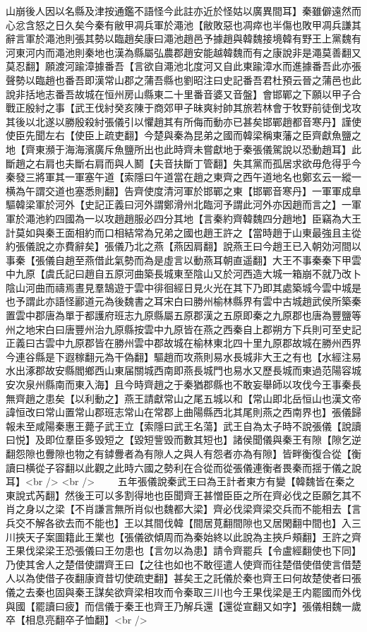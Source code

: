 山崩後人因以名縣及津按通鑑不語怪今此註亦近於怪姑以廣異間耳】秦雖僻遠然而心忿含怒之日久矣今秦有敝甲凋兵軍於澠池【敝敗惡也凋瘁也半傷也敗甲凋兵謙其辭言軍於澠池則張其勢以臨趙矣康曰澠池趙邑予據趙與韓魏接境韓有野王上黨魏有河東河内而澠池則秦地也漢為縣屬弘農郡趙安能越韓魏而有之康說非是澠莫善翻又莫忍翻】願渡河踰漳據番吾【言欲自澠池北度河又自此東踰漳水而進據番吾此亦張聲勢以臨趙也番吾即漢常山郡之蒲吾縣也劉昭注曰史記番吾君杜預云晉之蒲邑也此說非括地志番吾故城在恒州房山縣東二十里番音婆又音盤】會邯鄲之下願以甲子合戰正殷紂之事【武王伐紂癸亥陳于商郊甲子昧爽紂帥其旅若林會于牧野前徒倒戈攻其後以北遂以勝殷殺紂張儀引以懼趙其有所侮而動亦已甚矣邯鄲趙都音寒丹】謹使使臣先聞左右【使臣上疏吏翻】今楚與秦為昆弟之國而韓梁稱東藩之臣齊獻魚鹽之地【齊東瀕于海海濱廣斥魚鹽所出也此時齊未嘗獻地于秦張儀駕說以恐動趙耳】此斷趙之右肩也夫斷右肩而與人鬭【夫音扶斷丁管翻】失其黨而孤居求欲毋危得乎今秦發三將軍其一軍塞午道【索隱曰午道當在趙之東齊之西午道地名也鄭玄云一縱一横為午謂交道也塞悉則翻】告齊使度清河軍於邯鄲之東【邯鄲音寒丹】一軍軍成臯驅韓梁軍於河外【史記正義曰河外謂鄭滑州北臨河予謂此河外亦因趙而言之】一軍軍於澠池約四國為一以攻趙趙服必四分其地【言秦約齊韓魏四分趙地】臣竊為大王計莫如與秦王面相約而口相結常為兄弟之國也趙王許之【當時趙于山東最強且主從約張儀說之亦費辭矣】張儀乃北之燕【燕因肩翻】說燕王曰今趙王已入朝効河間以事秦【張儀自趙至燕借此氣勢而為是虛言以動燕耳朝直遥翻】大王不事秦秦下甲雲中九原【虞氏記曰趙自五原河曲築長城東至陰山又於河西造大城一箱崩不就乃改卜陰山河曲而禱焉晝見羣鵠遊于雲中徘徊經日見火光在其下乃即其處築城今雲中城是也予謂此亦語怪酈道元為後魏書之耳宋白曰勝州榆林縣界有雲中古城趙武侯所築秦置雲中郡唐為單于都護府班志九原縣屬五原郡漢之五原即秦之九原郡也唐為豐鹽等州之地宋白曰唐豐州治九原縣按雲中九原皆在燕之西秦自上郡朔方下兵則可至史記正義曰古雲中九原郡皆在勝州雲中郡故城在榆林東北四十里九原郡故城在勝州西界今連谷縣是下遐稼翻元為干偽翻】驅趙而攻燕則易水長城非大王之有也【水經注易水出涿郡故安縣閻鄉西山東届關城西南即燕長城門也易水又歷長城而東過范陽容城安次泉州縣南而東入海】且今時齊趙之于秦猶郡縣也不敢妄舉師以攻伐今王事秦長無齊趙之患矣【以利動之】燕王請獻常山之尾五城以和【常山即北岳恒山也漢文帝諱恒改曰常山置常山郡班志常山在常郡上曲陽縣西北其尾則燕之西南界也】張儀歸報未至咸陽秦惠王薨子武王立【索隱曰武王名蕩】武王自為太子時不說張儀【說讀曰悦】及即位羣臣多毁短之【毀短訾毁而數其短也】諸侯聞儀與秦王有隙【隙乞逆翻怨隙也釁隙也物之有鏬釁者為有隙人之與人有怨者亦為有隙】皆畔衡復合從【衡讀曰横從子容翻以此觀之此時六國之勢利在合從而從張儀連衡者畏秦而揺于儀之說耳】<br />
<br />
　　五年張儀說秦武王曰為王計者東方有變【韓魏皆在秦之東說式芮翻】然後王可以多割得地也臣聞齊王甚憎臣臣之所在齊必伐之臣願乞其不肖之身以之梁【不肖謙言無所肖似也魏都大梁】齊必伐梁齊梁交兵而不能相去【言兵交不解各欲去而不能也】王以其間伐韓【間居莧翻間隙也又居閑翻中間也】入三川挾天子案圖籍此王業也【張儀欲傾周而為秦始終以此說為主挾戶頰翻】王許之齊王果伐梁梁王恐張儀曰王勿患也【言勿以為患】請令齊罷兵【令盧經翻使也下同】乃使其舍人之楚借使謂齊王曰【之往也如也不敢徑遣人使齊而往楚借使借使言借楚人以為使借子夜翻康資昔切使疏吏翻】甚矣王之託儀於秦也齊王曰何故楚使者曰張儀之去秦也固與秦王謀矣欲齊梁相攻而令秦取三川也今王果伐梁是王内罷國而外伐與國【罷讀曰疲】而信儀于秦王也齊王乃解兵還【還從宣翻又如字】張儀相魏一歲卒【相息亮翻卒子恤翻】<br />
